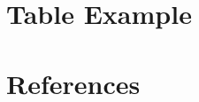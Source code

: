 \documentclass[12pt, a4paper]{article}
\begin{document}

\thispagestyle{empty}

\pagebreak

\renewcommand*\contentsname{Summary}
\tableofcontents
\thispagestyle{empty}
\pagebreak
\listoftables
\thispagestyle{empty}
\pagebreak
\listoffigures
\thispagestyle{empty}

\pagebreak

% 
\section{Table Example}


\pagebreak

\appendix

\section{References}
\printbibliography[heading=none]

\pagebreak[4]

% 
\end{document}
